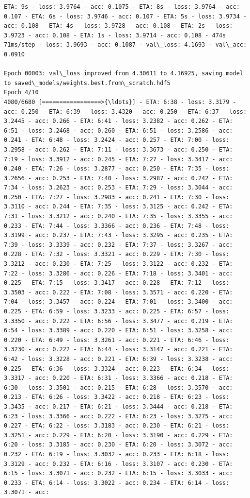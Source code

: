 \documentclass[11pt]{article}
\begin{document}
\begin{Verbatim}[commandchars=\\\{\}]
ETA: 9s - loss: 3.9764 - acc: 0.1075 - ETA: 8s - loss: 3.9764 - acc: 0.107 - ETA: 6s - loss: 3.9746 - acc: 0.107 - ETA: 5s - loss: 3.9734 - acc: 0.108 - ETA: 4s - loss: 3.9728 - acc: 0.108 - ETA: 2s - loss: 3.9723 - acc: 0.108 - ETA: 1s - loss: 3.9714 - acc: 0.108 - 474s 71ms/step - loss: 3.9693 - acc: 0.1087 - val\_loss: 4.1693 - val\_acc: 0.0910

Epoch 00003: val\_loss improved from 4.30611 to 4.16925, saving model to saved\_models/weights.best.from\_scratch.hdf5
Epoch 4/10
4080/6680 [=================>{\ldots}] - ETA: 6:38 - loss: 3.3179 - acc: 0.250 - ETA: 6:39 - loss: 3.4320 - acc: 0.250 - ETA: 6:37 - loss: 3.2445 - acc: 0.266 - ETA: 6:41 - loss: 3.2382 - acc: 0.262 - ETA: 6:51 - loss: 3.2468 - acc: 0.260 - ETA: 6:51 - loss: 3.2586 - acc: 0.241 - ETA: 6:48 - loss: 3.2424 - acc: 0.257 - ETA: 7:00 - loss: 3.2958 - acc: 0.262 - ETA: 7:11 - loss: 3.3673 - acc: 0.250 - ETA: 7:19 - loss: 3.3912 - acc: 0.245 - ETA: 7:27 - loss: 3.3417 - acc: 0.240 - ETA: 7:26 - loss: 3.2877 - acc: 0.250 - ETA: 7:35 - loss: 3.2656 - acc: 0.253 - ETA: 7:40 - loss: 3.2987 - acc: 0.242 - ETA: 7:34 - loss: 3.2623 - acc: 0.253 - ETA: 7:29 - loss: 3.3044 - acc: 0.250 - ETA: 7:27 - loss: 3.2983 - acc: 0.241 - ETA: 7:30 - loss: 3.3110 - acc: 0.244 - ETA: 7:35 - loss: 3.3125 - acc: 0.242 - ETA: 7:31 - loss: 3.3212 - acc: 0.240 - ETA: 7:35 - loss: 3.3355 - acc: 0.233 - ETA: 7:44 - loss: 3.3366 - acc: 0.236 - ETA: 7:48 - loss: 3.3199 - acc: 0.237 - ETA: 7:43 - loss: 3.3295 - acc: 0.235 - ETA: 7:39 - loss: 3.3339 - acc: 0.232 - ETA: 7:37 - loss: 3.3267 - acc: 0.228 - ETA: 7:32 - loss: 3.3321 - acc: 0.229 - ETA: 7:30 - loss: 3.3212 - acc: 0.230 - ETA: 7:25 - loss: 3.3122 - acc: 0.232 - ETA: 7:22 - loss: 3.3286 - acc: 0.226 - ETA: 7:18 - loss: 3.3401 - acc: 0.225 - ETA: 7:15 - loss: 3.3417 - acc: 0.228 - ETA: 7:12 - loss: 3.3503 - acc: 0.222 - ETA: 7:08 - loss: 3.3571 - acc: 0.220 - ETA: 7:04 - loss: 3.3457 - acc: 0.224 - ETA: 7:01 - loss: 3.3400 - acc: 0.225 - ETA: 6:59 - loss: 3.3233 - acc: 0.225 - ETA: 6:57 - loss: 3.3350 - acc: 0.222 - ETA: 6:56 - loss: 3.3477 - acc: 0.219 - ETA: 6:54 - loss: 3.3389 - acc: 0.220 - ETA: 6:51 - loss: 3.3258 - acc: 0.220 - ETA: 6:49 - loss: 3.3261 - acc: 0.221 - ETA: 6:46 - loss: 3.3230 - acc: 0.222 - ETA: 6:44 - loss: 3.3147 - acc: 0.221 - ETA: 6:42 - loss: 3.3228 - acc: 0.221 - ETA: 6:39 - loss: 3.3238 - acc: 0.225 - ETA: 6:36 - loss: 3.3324 - acc: 0.223 - ETA: 6:34 - loss: 3.3317 - acc: 0.220 - ETA: 6:31 - loss: 3.3366 - acc: 0.218 - ETA: 6:30 - loss: 3.3501 - acc: 0.215 - ETA: 6:28 - loss: 3.3570 - acc: 0.213 - ETA: 6:26 - loss: 3.3422 - acc: 0.218 - ETA: 6:23 - loss: 3.3435 - acc: 0.217 - ETA: 6:21 - loss: 3.3444 - acc: 0.218 - ETA: 6:23 - loss: 3.3366 - acc: 0.222 - ETA: 6:23 - loss: 3.3275 - acc: 0.227 - ETA: 6:22 - loss: 3.3183 - acc: 0.230 - ETA: 6:21 - loss: 3.3251 - acc: 0.229 - ETA: 6:20 - loss: 3.3190 - acc: 0.229 - ETA: 6:20 - loss: 3.3185 - acc: 0.230 - ETA: 6:20 - loss: 3.3072 - acc: 0.232 - ETA: 6:19 - loss: 3.3032 - acc: 0.233 - ETA: 6:18 - loss: 3.3129 - acc: 0.232 - ETA: 6:16 - loss: 3.3107 - acc: 0.230 - ETA: 6:15 - loss: 3.3071 - acc: 0.232 - ETA: 6:15 - loss: 3.3033 - acc: 0.233 - ETA: 6:14 - loss: 3.3022 - acc: 0.234 - ETA: 6:14 - loss: 3.3071 - acc: 
\end{Verbatim}
\end{document}
